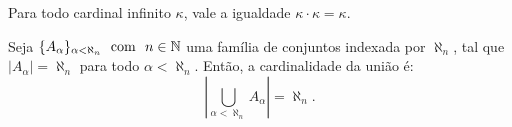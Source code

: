 \begin{teorema}
    \label{teo:kappa_quadrado}
    Para todo cardinal infinito $\kappa$, vale a igualdade $\kappa \cdot \kappa = \kappa$.
\end{teorema}

\begin{corolario}
    \label{cor:uniao_alephn}
    Seja $\{A_\alpha\}_{\alpha < \aleph_n} \ \text{ com }\  n \in \mathbb{N}$ uma família de conjuntos indexada por $\aleph_n$, tal que $|A_\alpha| = \aleph_n$ para todo $\alpha < \aleph_n$. Então, a cardinalidade da união é:
    \[
    \left| \bigcup_{\alpha < \aleph_n} A_\alpha \right| = \aleph_n.
    \]
\end{corolario}